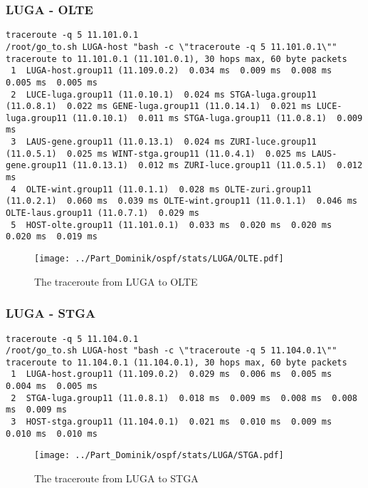 \subsubsection{LUGA - OLTE}
\begin{lstlisting}
traceroute -q 5 11.101.0.1
/root/go_to.sh LUGA-host "bash -c \"traceroute -q 5 11.101.0.1\""
traceroute to 11.101.0.1 (11.101.0.1), 30 hops max, 60 byte packets
 1  LUGA-host.group11 (11.109.0.2)  0.034 ms  0.009 ms  0.008 ms  0.005 ms  0.005 ms
 2  LUCE-luga.group11 (11.0.10.1)  0.024 ms STGA-luga.group11 (11.0.8.1)  0.022 ms GENE-luga.group11 (11.0.14.1)  0.021 ms LUCE-luga.group11 (11.0.10.1)  0.011 ms STGA-luga.group11 (11.0.8.1)  0.009 ms
 3  LAUS-gene.group11 (11.0.13.1)  0.024 ms ZURI-luce.group11 (11.0.5.1)  0.025 ms WINT-stga.group11 (11.0.4.1)  0.025 ms LAUS-gene.group11 (11.0.13.1)  0.012 ms ZURI-luce.group11 (11.0.5.1)  0.012 ms
 4  OLTE-wint.group11 (11.0.1.1)  0.028 ms OLTE-zuri.group11 (11.0.2.1)  0.060 ms  0.039 ms OLTE-wint.group11 (11.0.1.1)  0.046 ms OLTE-laus.group11 (11.0.7.1)  0.029 ms
 5  HOST-olte.group11 (11.101.0.1)  0.033 ms  0.020 ms  0.020 ms  0.020 ms  0.019 ms
\end{lstlisting}
\begin{figure}[H]
\centering
\texttt{[image: ../Part\_Dominik/ospf/stats/LUGA/OLTE.pdf]}
\caption{The traceroute from LUGA to OLTE}
\end{figure}
\clearpage
\subsubsection{LUGA - STGA}
\begin{lstlisting}
traceroute -q 5 11.104.0.1
/root/go_to.sh LUGA-host "bash -c \"traceroute -q 5 11.104.0.1\""
traceroute to 11.104.0.1 (11.104.0.1), 30 hops max, 60 byte packets
 1  LUGA-host.group11 (11.109.0.2)  0.029 ms  0.006 ms  0.005 ms  0.004 ms  0.005 ms
 2  STGA-luga.group11 (11.0.8.1)  0.018 ms  0.009 ms  0.008 ms  0.008 ms  0.009 ms
 3  HOST-stga.group11 (11.104.0.1)  0.021 ms  0.010 ms  0.009 ms  0.010 ms  0.010 ms
\end{lstlisting}
\begin{figure}[H]
\centering
\texttt{[image: ../Part\_Dominik/ospf/stats/LUGA/STGA.pdf]}
\caption{The traceroute from LUGA to STGA}
\end{figure}
\clearpage

